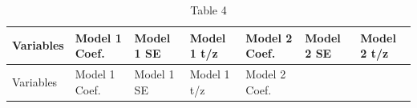 \documentclass[
  12pt,
]{article}
\begin{document}
\begin{longtable}[]{@{}
  >{\raggedright\arraybackslash}p{}
  >{\raggedleft\arraybackslash}p{}
  >{\raggedleft\arraybackslash}p{}
  >{\raggedleft\arraybackslash}p{}
  >{\raggedleft\arraybackslash}p{}
  >{\raggedleft\arraybackslash}p{}
  >{\raggedleft\arraybackslash}p{}@{}}
\caption{Table 4}\label{tbl-ablation}\tabularnewline
\toprule\noalign{}
\begin{minipage}[b]{\linewidth}\raggedright
Variables
\end{minipage} & \begin{minipage}[b]{\linewidth}\raggedleft
Model 1 Coef.
\end{minipage} & \begin{minipage}[b]{\linewidth}\raggedleft
Model 1 SE
\end{minipage} & \begin{minipage}[b]{\linewidth}\raggedleft
Model 1 t/z
\end{minipage} & \begin{minipage}[b]{\linewidth}\raggedleft
Model 2 Coef.
\end{minipage} & \begin{minipage}[b]{\linewidth}\raggedleft
Model 2 SE
\end{minipage} & \begin{minipage}[b]{\linewidth}\raggedleft
Model 2 t/z
\end{minipage} \\
\midrule\noalign{}
\endfirsthead
\toprule\noalign{}
\begin{minipage}[b]{\linewidth}\raggedright
Variables
\end{minipage} & \begin{minipage}[b]{\linewidth}\raggedleft
Model 1 Coef.
\end{minipage} & \begin{minipage}[b]{\linewidth}\raggedleft
Model 1 SE
\end{minipage} & \begin{minipage}[b]{\linewidth}\raggedleft
Model 1 t/z
\end{minipage} & \begin{minipage}[b]{\linewidth}\raggedleft
Model 2 Coef.
\end{minipage} & \begin{minipage}[b]{\linewidth}\raggedleft

\end{minipage}
\end{longtable}
\end{document}
